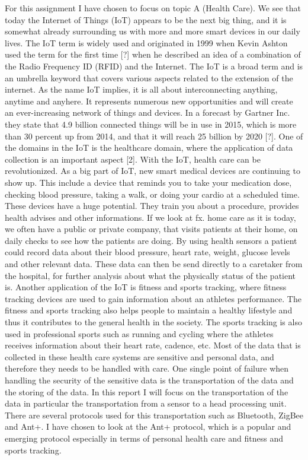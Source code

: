 For this assignment I have chosen to focus on topic A (Health Care). We see that today the Internet of Things (IoT) appears to be the next big thing, and it is somewhat already surrounding us with more and more smart devices in our daily lives. The IoT term is widely used and originated in 1999 when Kevin Ashton used the term for the first time [?] when he described an idea of a combination of the Radio Frequency ID (RFID) and the Internet. The IoT is a broad term and is an umbrella keyword that covers various aspects related to the extension of the internet. As the name IoT implies, it is all about interconnecting anything, anytime and anyhere. It represents numerous new opportunities and will create an ever-increasing network of things and devices. In a forecast by Gartner Inc. they state that 4.9 billion connected things will be in use in 2015, which is more than 30 percent up from 2014, and that it will reach 25 billion by 2020 [?]. One of the domains in the IoT is the healthcare domain, where the application of data collection is an important aspect [2].
With the IoT, health care can be revolutionized. As a big part of IoT, new smart medical devices are continuing to show up. This include a device that reminds you to take your medication dose, checking blood pressure, taking a walk, or doing your cardio at a scheduled time. These devices have a huge potential. They train you about a procedure, provides health advises and other informations. If we look at fx. home care as it is today, we often have a public or private company, that visits patients at their home, on daily checks to see how the patients are doing. By using health sensors a patient could record data about their blood pressure, heart rate, weight, glucose levels and other relevant data. These data can then be send directly to a caretaker from the hospital, for further analysis about what the physically status of the patient is.
Another application of the IoT is fitness and sports tracking, where fitness tracking devices are used to gain information about an athletes performance. The fitness and sports tracking also helps people to maintain a healthy lifestyle and thus it contributes to the general health in the society. The sports tracking is also used in professional sports such as running and cycling where the athletes receives information about their heart rate, cadence, etc.
Most of the data that is collected in these health care systems are sensitive and personal data, and therefore they needs to be handled with care. One single point of failure when handling the security of the sensitive data is the transportation of the data and the storing of the data. In this report I will focus on the transportation of the data in particular the transportation from a sensor to a head processing unit. There are several protocols used for this transportation such as Bluetooth, ZigBee and Ant+. I have chosen to look at the Ant+ protocol, which is a popular and emerging protocol especially in terms of personal health care and fitness and sports tracking.
